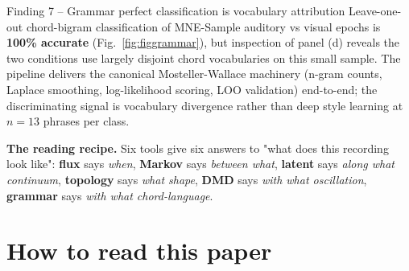 \documentclass[11pt,a4paper]{article}
\begin{document}
\begin{headlinebox}{Finding 7 -- Grammar perfect classification is vocabulary attribution}
Leave-one-out chord-bigram classification of MNE-Sample auditory vs
visual epochs is \textbf{100\% accurate} (Fig.~\ref{fig:figgrammar}),
but inspection of panel (d) reveals the two conditions use largely
disjoint chord vocabularies on this small sample. The pipeline
delivers the canonical Mosteller-Wallace machinery (n-gram
counts, Laplace smoothing, log-likelihood scoring, LOO validation)
end-to-end; the discriminating signal is vocabulary divergence
rather than deep style learning at $n = 13$ phrases per class.
\end{headlinebox}

\noindent\textbf{The reading recipe.}  Six tools give six answers
to "what does this recording look like": \textbf{flux} says
\emph{when}, \textbf{Markov} says \emph{between what}, \textbf{latent}
says \emph{along what continuum}, \textbf{topology} says \emph{what
shape}, \textbf{DMD} says \emph{with what oscillation}, \textbf{grammar}
says \emph{with what chord-language}.

\bigskip

\section*{How to read this paper}
\end{document}
